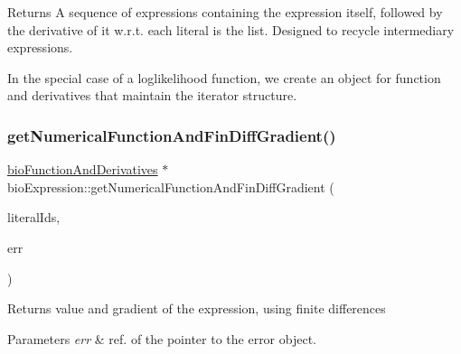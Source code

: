\begin{DoxyReturn}{Returns}
A sequence of expressions containing the expression itself, followed by the derivative of it w.\+r.\+t. each literal is the list. Designed to recycle intermediary expressions.

In the special case of a loglikelihood function, we create an object for function and derivatives that maintain the iterator structure. 
\end{DoxyReturn}
\mbox{\label{classbio_expression_a2af51db0148a3fecce133ca4fa4a0bdc}} 
\subsubsection{\texorpdfstring{get\+Numerical\+Function\+And\+Fin\+Diff\+Gradient()}{getNumericalFunctionAndFinDiffGradient()}}
{\footnotesize\ttfamily \hyperlink{classbio_function_and_derivatives}{bio\+Function\+And\+Derivatives} $\ast$ bio\+Expression\+::get\+Numerical\+Function\+And\+Fin\+Diff\+Gradient (\begin{DoxyParamCaption}\item[{vector$<$ pat\+U\+Long $>$}]{literal\+Ids,  }\item[{pat\+Error $\ast$\&}]{err }\end{DoxyParamCaption})\hspace{0.3cm}{\ttfamily [virtual]}}

\begin{DoxyReturn}{Returns}
value and gradient of the expression, using finite differences 
\end{DoxyReturn}

\begin{DoxyParams}{Parameters}
{\em err} & ref. of the pointer to the error object. \\
\hline
\end{DoxyParams}
\mbox{\label{classbio_expression_a91c81ce80c9e972c913b10f5f3c1ed13}} 
